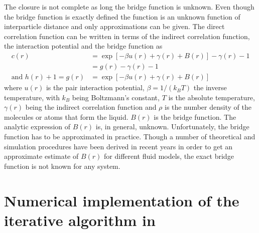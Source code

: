  The closure is not complete as long the bridge function is
unknown. Even though the bridge function is exactly defined the
function is an unknown function of interparticle distance and only
approximations can be given. The direct correlation function can be
written in terms of the indirect correlation function, the
interaction potential and the bridge function as
\begin{align}\label{eq:ozclosure}
c(r)&= \exp\left[ -\beta u(r) +\gamma(r)+B(r)\right] - \gamma(r)-1 \\
    &= g(r)- \gamma(r)-1 \nonumber \\
\mbox{and } h(r)+1=g(r)&= \exp\left[ -\beta u(r)
+\gamma(r)+B(r)\right] \label{eq:ozg(r)}
\end{align}
where $u(r)$ is the pair interaction potential, $\beta=1/(k_B T)$
the inverse temperature, with $k_B$ being Boltzmann's constant, $T$
is the absolute temperature, $\gamma(r)$ being the indirect
correlation function and $\rho$ is the number density of the
molecules or atoms that form the liquid. $B(r)$ is the bridge
function. The analytic expression of $B(r)$ is, in general, unknown.
Unfortunately, the bridge function has to be approximated in
practice. Though a number of theoretical and simulation procedures
have been derived in recent years in order to get an approximate
estimate of $B(r)$ for different fluid models, the exact bridge
function is not known for any system.

\section{Numerical implementation of the iterative algorithm in \SASfit}

